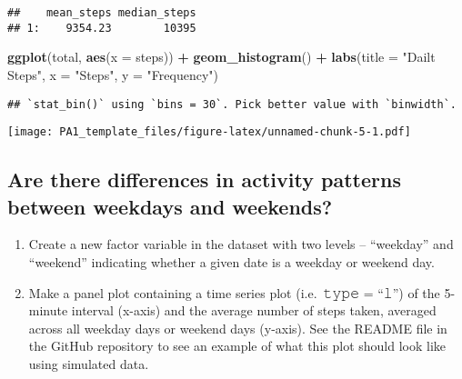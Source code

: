 \documentclass[
]{article}
\newenvironment{Shaded}{\begin{snugshade}}{\end{snugshade}}
\newcommand{\DataTypeTok}[1]{\textcolor[rgb]{0.13,0.29,0.53}{#1}}
\newcommand{\KeywordTok}[1]{\textcolor[rgb]{0.13,0.29,0.53}{\textbf{#1}}}
\newcommand{\NormalTok}[1]{#1}
\newcommand{\OperatorTok}[1]{\textcolor[rgb]{0.81,0.36,0.00}{\textbf{#1}}}
\newcommand{\StringTok}[1]{\textcolor[rgb]{0.31,0.60,0.02}{#1}}
\providecommand{\tightlist}{%
  \setlength{\itemsep}{0pt}\setlength{\parskip}{0pt}}
\begin{document}
\begin{verbatim}
##    mean_steps median_steps
## 1:    9354.23        10395
\end{verbatim}

\begin{Shaded}
\begin{Highlighting}[]
\KeywordTok{ggplot}\NormalTok{(total, }\KeywordTok{aes}\NormalTok{(}\DataTypeTok{x =}\NormalTok{ steps)) }\OperatorTok{+}
\StringTok{        }\KeywordTok{geom_histogram}\NormalTok{() }\OperatorTok{+}
\StringTok{        }\KeywordTok{labs}\NormalTok{(}\DataTypeTok{title =} \StringTok{"Dailt Steps"}\NormalTok{, }\DataTypeTok{x =} \StringTok{"Steps"}\NormalTok{, }\DataTypeTok{y =} \StringTok{"Frequency"}\NormalTok{)}
\end{Highlighting}
\end{Shaded}

\begin{verbatim}
## `stat_bin()` using `bins = 30`. Pick better value with `binwidth`.
\end{verbatim}

\texttt{[image: PA1\_template\_files/figure-latex/unnamed-chunk-5-1.pdf]}

\hypertarget{are-there-differences-in-activity-patterns-between-weekdays-and-weekends}{%
\subsection{Are there differences in activity patterns between weekdays
and
weekends?}\label{are-there-differences-in-activity-patterns-between-weekdays-and-weekends}}

\begin{enumerate}
\def\labelenumi{\arabic{enumi}.}
\tightlist
\item
  Create a new factor variable in the dataset with two levels --
  ``weekday'' and ``weekend'' indicating whether a given date is a
  weekday or weekend day.
\item
  Make a panel plot containing a time series plot (i.e.~𝚝𝚢𝚙𝚎 = ``𝚕'') of
  the 5-minute interval (x-axis) and the average number of steps taken,
  averaged across all weekday days or weekend days (y-axis). See the
  README file in the GitHub repository to see an example of what this
  plot should look like using simulated data.
\end{enumerate}
\end{document}
